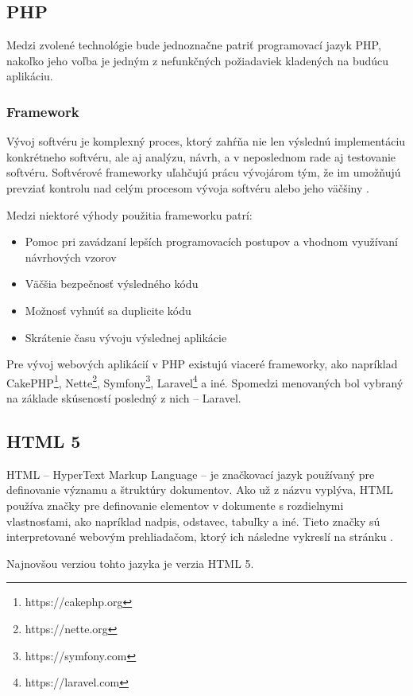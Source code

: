 \subsection{PHP}
Medzi zvolené technológie bude jednoznačne patriť programovací jazyk PHP, nakoľko jeho voľba je jedným z nefunkčných požiadaviek kladených na budúcu aplikáciu. 

\subsubsection*{Framework}
Vývoj softvéru je komplexný proces, ktorý zahŕňa nie len výslednú implementáciu konkrétneho softvéru, ale aj analýzu, návrh, a v neposlednom rade aj testovanie softvéru. Softvérové frameworky uľahčujú prácu vývojárom tým, že im umožňujú prevziať kontrolu nad celým procesom vývoja softvéru alebo jeho väčšiny \cite{co-je-framework}.

Medzi niektoré výhody použitia frameworku patrí:

\begin{itemize}
	\item Pomoc pri zavádzaní lepších programovacích postupov a vhodnom využívaní návrhových vzorov
	\item Väčšia bezpečnosť výsledného kódu
	\item Možnosť vyhnúť sa duplicite kódu
	\item Skrátenie času vývoju výslednej aplikácie
\end{itemize}

Pre vývoj webových aplikácií v PHP existujú viaceré frameworky, ako napríklad CakePHP\footnote{https://cakephp.org}, Nette\footnote{https://nette.org}, Symfony\footnote{https://symfony.com}, Laravel\footnote{https://laravel.com} a iné.
Spomedzi menovaných bol vybraný na základe skúseností posledný z nich -- Laravel.

\subsection{HTML 5}
HTML -- HyperText Markup Language -- je značkovací jazyk používaný pre definovanie významu a štruktúry dokumentov. Ako už z názvu vyplýva, HTML používa značky pre definovanie elementov v dokumente s rozdielnymi vlastnosťami, ako napríklad nadpis, odstavec, tabuľky a iné.
Tieto značky sú interpretované webovým prehliadačom, ktorý ich následne vykreslí na stránku \cite{co-je-html}.

Najnovšou verziou tohto jazyka je verzia HTML 5.


